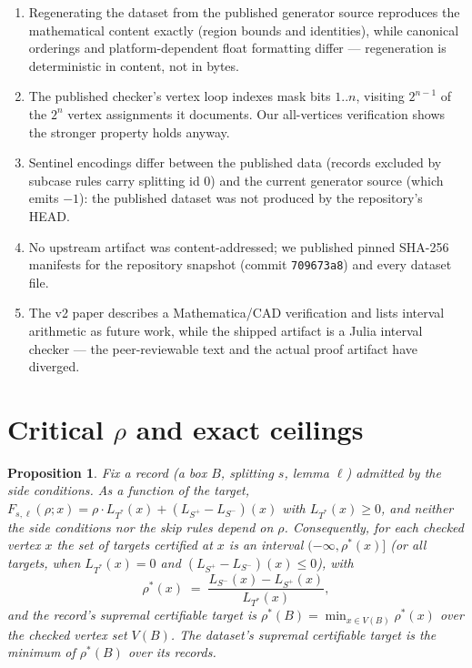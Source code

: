 \documentclass[11pt]{article}
\newtheorem{proposition}{Proposition}
\newcommand{\rr}{\rho}
\newcommand{\ts}{L_{T^*}}
\newcommand{\snet}{L_{S^+}\!-\!L_{S^-}}
\begin{document}
\begin{enumerate}
  \item[F1.] Regenerating the dataset from the published generator
  source reproduces the mathematical content exactly (region bounds and
  identities), while canonical orderings and platform-dependent float
  formatting differ --- regeneration is deterministic in content, not in
  bytes.
  \item[F2.] The published checker's vertex loop indexes mask bits
  $1..n$, visiting $2^{n-1}$ of the $2^n$ vertex assignments it
  documents. Our all-vertices verification shows the stronger property
  holds anyway.
  \item[F3.] Sentinel encodings differ between the published data
  (records excluded by subcase rules carry splitting id $0$) and the
  current generator source (which emits $-1$): the published dataset was
  not produced by the repository's HEAD.
  \item[F4.] No upstream artifact was content-addressed; we published
  pinned SHA-256 manifests for the repository snapshot (commit
  \texttt{709673a8}) and every dataset file.
  \item[F5.] The v2 paper describes a Mathematica/CAD verification and
  lists interval arithmetic as future work, while the shipped artifact
  is a Julia interval checker --- the peer-reviewable text and the actual
  proof artifact have diverged.
\end{enumerate}

\section{Critical $\rr$ and exact ceilings}\label{sec:ceiling}

\begin{proposition}\label{prop:affine}
Fix a record (a box $B$, splitting $s$, lemma $\ell$) admitted by the
side conditions. As a function of the target, $F_{s,\ell}(\rr; x) = \rr
\cdot \ts(x) + (\snet)(x)$ with $\ts(x) \ge 0$, and neither the side
conditions nor the skip rules depend on $\rr$. Consequently, for each
checked vertex $x$ the set of targets certified at $x$ is an interval
$(-\infty, \rr^\ast(x)]$ (or all targets, when $\ts(x)=0$ and
$(\snet)(x) \le 0$), with
\[
\rr^\ast(x) \;=\; \frac{L_{S^-}(x) - L_{S^+}(x)}{\ts(x)},
\]
and the record's supremal certifiable target is $\rr^\ast(B) =
\min_{x \in V(B)} \rr^\ast(x)$ over the checked vertex set $V(B)$. The
dataset's supremal certifiable target is the minimum of $\rr^\ast(B)$
over its records.
\end{proposition}
\end{document}
